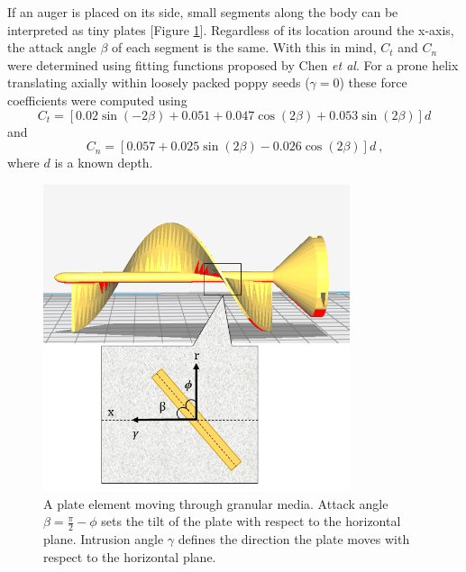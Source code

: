 \documentclass[letterpaper, 11 pt]{article}
\begin{document}
If an auger is placed on its side, small segments along the body can be interpreted as tiny plates [Figure \ref{fig:helix_plate}]. Regardless of its location around the x-axis, the attack angle $\beta$ of each segment is the same. With this in mind, $C_t$ and $C_n$ were determined using fitting functions proposed by Chen \textit{et al}. For a prone helix translating axially within loosely packed poppy seeds ($\gamma = 0$) these force coefficients were computed using 
\begin{equation}\label{chenCt}
C_t = \left[0.02\sin(-2\beta)+0.051+0.047\cos(2\beta)+0.053\sin(2\beta) \right]d
\end{equation}
and
\begin{equation}\label{chenCn}
C_n = \left[0.057+0.025\sin(2\beta)-0.026\cos(2\beta) \right]d\ \text{,}
\end{equation}
where $d$ is a known depth. 

\begin{figure}[H]
\centering
\includegraphics[height=9cm]{./imgs/helix_plate}
\caption{A plate element moving through granular media. Attack angle $\beta = \frac{\pi}{2} - \phi$ sets the tilt of the plate with respect to the horizontal plane. Intrusion angle $\gamma$ defines the direction the plate moves with respect to the horizontal plane. }
\label{fig:helix_plate}
\end{figure}
\end{document}
